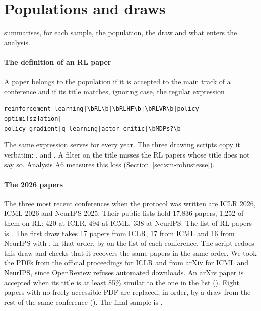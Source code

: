 \section{Populations and draws}\label{sec:sm-tirages}

 summarises, for each sample, the population, the draw and what enters the
analysis.

\paragraph{The definition of an RL paper}
A paper belongs to the population if it is accepted to the main track of a conference and if its
title matches, ignoring case, the regular expression
\begin{center}
\small\verb!reinforcement learning|\bRL\b|\bRLHF\b|\bRLVR\b|policy optimi[sz]ation|!\\
\small\verb!policy gradient|q-learning|actor-critic|\bMDPs?\b!
\end{center}
The same expression serves for every year. The three drawing scripts copy it verbatim:
,  and . A
filter on the title misses the RL papers whose title does not say so. Analysis A6 measures this loss
(Section~\ref{sec:sm-robustesse}).

\paragraph{The 2026 papers}
The three most recent conferences when the protocol was written are ICLR 2026, ICML 2026 and NeurIPS 2025.
Their public lists hold 17,836 papers, 1,252 of them on RL: 420 at ICLR, 494 at ICML, 338 at
NeurIPS. The list of RL papers is . The first draw takes 17 papers
from ICLR, 17 from ICML and 16 from NeurIPS with , in that order, by
 on the list of each conference. The script  redoes this draw
and checks that it recovers the same papers in the same order. We took the PDFs from the official
proceedings for ICLR and from arXiv for ICML and NeurIPS, since OpenReview refuses automated downloads. An
arXiv paper is accepted when its title is at least 85\% similar to the one in the list
(). Eight papers with no freely accessible PDF are replaced, in order, by
a  draw from the rest of the same conference
(). The final sample is .

